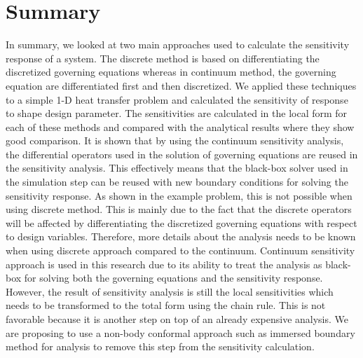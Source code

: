 \section{Summary}
In summary, we looked at two main approaches used to calculate the sensitivity response of a system. The discrete method is based on differentiating the discretized governing equations whereas in continuum method, the governing equation are differentiated first and then discretized. We applied these techniques to a simple 1-D heat transfer problem and calculated the sensitivity of response to shape design parameter. The sensitivities are calculated in the local form for each of these methods and compared with the analytical results where they show good comparison. It is shown that by using the continuum sensitivity analysis, the differential operators used in the solution of governing equations are reused in the sensitivity analysis. This effectively means that the black-box solver used in the simulation step can be reused with new boundary conditions for solving the sensitivity response. As shown in the example problem, this is not possible when using discrete method. This is mainly due to the fact that the discrete operators will be affected by differentiating the discretized governing equations with respect to design variables. Therefore, more details about the analysis needs to be known when using discrete approach compared to the continuum. Continuum sensitivity approach is used in this research due to its ability to treat the analysis as black-box for solving both the governing equations and the sensitivity response. However, the result of sensitivity analysis is still the local sensitivities which needs to be transformed to the total form using the chain rule. This is not favorable because it is another step on top of an already expensive analysis. We are proposing to use a non-body conformal approach such as immersed boundary method for analysis to remove this step from the sensitivity calculation.
